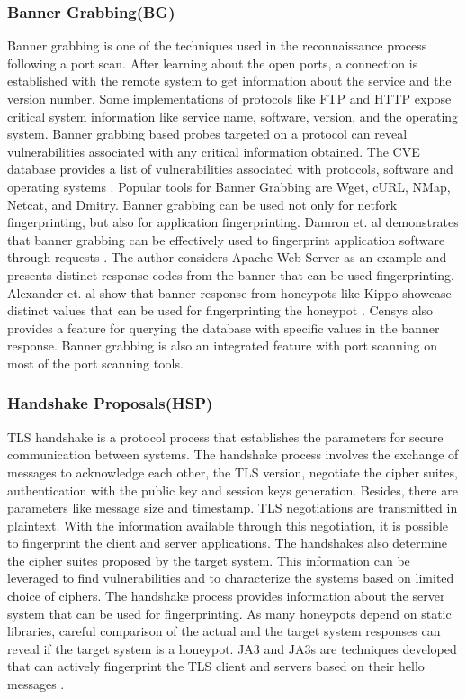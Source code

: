 \subsubsection{Banner Grabbing(BG)}
Banner grabbing is one of the techniques used in the reconnaissance process following a port scan. After learning about the open ports, a connection is established with the remote system to get information about the service and the version number. Some implementations of protocols like FTP and HTTP expose critical system information like service name, software, version, and the operating system. Banner grabbing based probes targeted on a protocol can reveal vulnerabilities associated with any critical information obtained. The CVE database provides a list of vulnerabilities associated with protocols, software and operating systems  \cite{CVE}. Popular tools for Banner Grabbing are Wget\cite{wget}, cURL\cite{curl}, NMap\cite{NMap}, Netcat\cite{netcat}, and Dmitry\cite{dmitry}. Banner grabbing can be used not only for netfork fingerprinting, but also for application fingerprinting. Damron et. al  demonstrates that banner grabbing can be effectively used to fingerprint application software through requests \cite{bannergrab}. The author considers Apache Web Server as an example and presents distinct response codes from the banner that can be used fingerprinting. Alexander et. al  show that banner response from honeypots like Kippo showcase distinct values that can be used for fingerprinting the honeypot \cite{Vetterl2018}. Censys also provides a feature for querying the database with specific values in the banner response. Banner grabbing is also an integrated feature with port scanning on most of the port scanning tools. 

\subsubsection{Handshake Proposals(HSP)}
TLS handshake is a protocol process that establishes the parameters for secure communication between systems. The handshake process involves the exchange of messages to acknowledge each other, the TLS version,  negotiate the cipher suites, authentication with the public key and session keys generation. Besides, there are parameters like message size and timestamp. TLS negotiations are transmitted in plaintext. With the information available through this negotiation, it is possible to fingerprint the client and server applications.  The handshakes also determine the cipher suites proposed by the target system. This information can be leveraged to find vulnerabilities and to characterize the systems based on limited choice of ciphers. The handshake process provides information about the server system that can be used for fingerprinting. As many honeypots depend on static libraries, careful comparison of the actual and the target system responses can reveal if the target system is a honeypot. 
JA3 and JA3s are techniques developed that can actively fingerprint the TLS client and servers based on their hello messages \cite{JA3}. 



